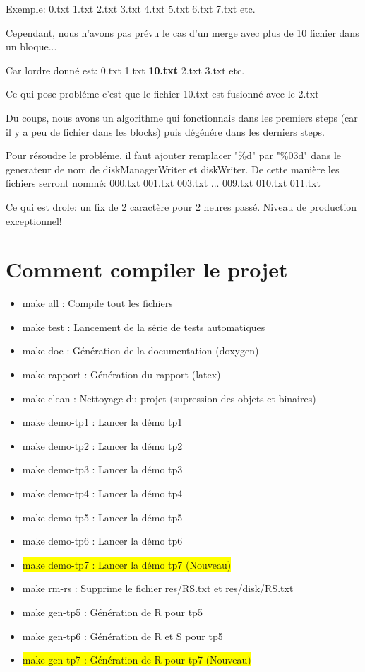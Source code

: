 \documentclass[a4paper]{article}
\begin{document}
Exemple: 0.txt 1.txt  2.txt  3.txt  4.txt  5.txt  6.txt  7.txt etc.

Cependant, nous n'avons pas prévu le cas d'un merge avec plus de 10 fichier dans
un bloque...

Car lordre donné est: 0.txt 1.txt \textbf{10.txt} 2.txt  3.txt etc.

Ce qui pose probléme c'est que le fichier 10.txt est fusionné avec le 2.txt

Du coups, nous avons un algorithme qui fonctionnais dans les premiers steps
(car il y a peu de fichier dans les blocks) puis dégénére dans les derniers
steps.

Pour résoudre le probléme, il faut ajouter remplacer "\%d" par "\%03d" dans le generateur
de nom de diskManagerWriter et diskWriter. De cette manière les fichiers
serront nommé: 000.txt 001.txt 003.txt ... 009.txt 010.txt 011.txt

Ce qui est drole: un fix de 2 caractère pour 2 heures passé.
Niveau de production exceptionnel!

\section{Comment compiler le projet}

\begin{itemize}
	\item make all : Compile tout les fichiers
	\item make test : Lancement de la série de tests automatiques
	\item make doc  : Génération de la documentation (doxygen)
	\item make rapport : Génération du rapport (latex)
	\item make clean : Nettoyage du projet (supression des objets et binaires)
	\item make demo-tp1 : Lancer la démo tp1
	\item make demo-tp2 : Lancer la démo tp2
	\item make demo-tp3 : Lancer la démo tp3
	\item make demo-tp4 : Lancer la démo tp4
	\item make demo-tp5 : Lancer la démo tp5
  \item make demo-tp6 : Lancer la démo tp6
  \item \colorbox{yellow}{make demo-tp7 : Lancer la démo tp7 (Nouveau)}
	\item make rm-rs : Supprime le fichier res/RS.txt et res/disk/RS.txt
  \item make gen-tp5 : Génération de R pour tp5
  \item make gen-tp6 : Génération de R et S pour tp5
  \item \colorbox{yellow}{make gen-tp7 : Génération de R pour tp7 (Nouveau)}
\end{itemize}
\end{document}
